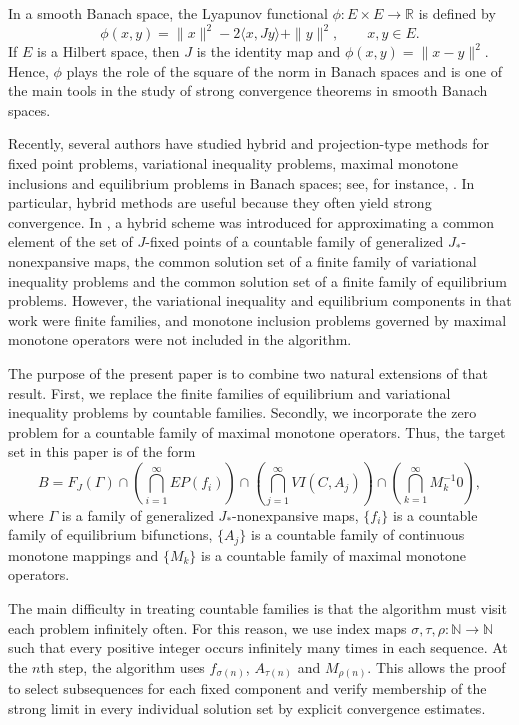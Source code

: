 \documentclass[leqno,12pt]{amsart}
\theoremstyle{definition}
\numberwithin{equation}{section}
\begin{document}
In a smooth Banach space, the Lyapunov functional $\phi:E\times E\to\mathbb{R}$ is defined by
\begin{equation}\label{phi}
\phi(x,y)=\|x\|^{2}-2\langle x,Jy\rangle+\|y\|^{2},\qquad x,y\in E.
\end{equation}
If $E$ is a Hilbert space, then $J$ is the identity map and $\phi(x,y)=\|x-y\|^{2}$. Hence, $\phi$ plays the role of the square of the norm in Banach spaces and is one of the main tools in the study of strong convergence theorems in smooth Banach spaces.

Recently, several authors have studied hybrid and projection-type methods for fixed point problems, variational inequality problems, maximal monotone inclusions and equilibrium problems in Banach spaces; see, for instance, \cite{ChidumeIdu2016,ChidumeOtuboEzeaUba2017,KlineamSuantaiTakahashi2012}. In particular, hybrid methods are useful because they often yield strong convergence. In \cite{UbaCarpathian2023}, a hybrid scheme was introduced for approximating a common element of the set of $J$-fixed points of a countable family of generalized $J_{*}$-nonexpansive maps, the common solution set of a finite family of variational inequality problems and the common solution set of a finite family of equilibrium problems. However, the variational inequality and equilibrium components in that work were finite families, and monotone inclusion problems governed by maximal monotone operators were not included in the algorithm.

The purpose of the present paper is to combine two natural extensions of that result. First, we replace the finite families of equilibrium and variational inequality problems by countable families. Secondly, we incorporate the zero problem for a countable family of maximal monotone operators. Thus, the target set in this paper is of the form
\[
B=F_J(\Gamma)\cap\left(\bigcap_{i=1}^{\infty}EP(f_i)\right)
\cap\left(\bigcap_{j=1}^{\infty}VI(C,A_j)\right)
\cap\left(\bigcap_{k=1}^{\infty}M_k^{-1}0\right),
\]
where $\Gamma$ is a family of generalized $J_{*}$-nonexpansive maps, $\{f_i\}$ is a countable family of equilibrium bifunctions, $\{A_j\}$ is a countable family of continuous monotone mappings and $\{M_k\}$ is a countable family of maximal monotone operators.

The main difficulty in treating countable families is that the algorithm must visit each problem infinitely often. For this reason, we use index maps $\sigma,\tau,\rho:\mathbb{N}\to\mathbb{N}$ such that every positive integer occurs infinitely many times in each sequence. At the $n$th step, the algorithm uses $f_{\sigma(n)}$, $A_{\tau(n)}$ and $M_{\rho(n)}$. This allows the proof to select subsequences for each fixed component and verify membership of the strong limit in every individual solution set by explicit convergence estimates.
\end{document}
